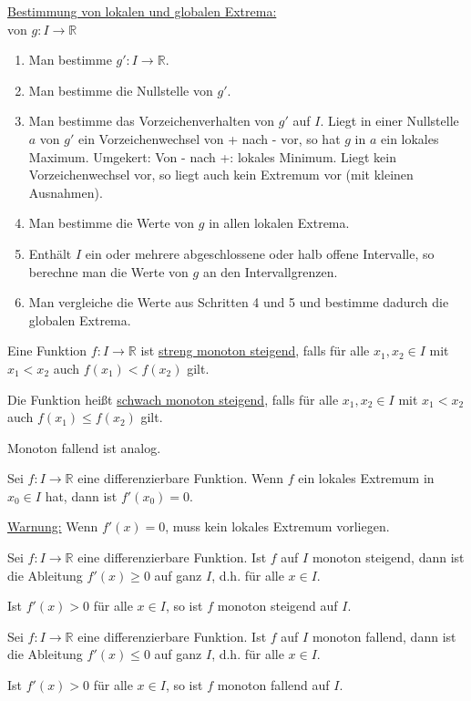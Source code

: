 \documentclass{mg2}
\begin{document}
\underline{Bestimmung von lokalen und globalen Extrema:}\\[1em]
von $g: I \to \mathbb{R}$

\begin{enumerate}
\item Man bestimme $g': I \to \mathbb{R}$.
\item Man bestimme die Nullstelle von $g'$.
\item Man bestimme das Vorzeichenverhalten von $g'$ auf $I$. Liegt in einer Nullstelle $a$ von $g'$ ein Vorzeichenwechsel von + nach - vor, so hat $g$ in $a$ ein lokales Maximum. Umgekert: Von - nach +: lokales Minimum. Liegt kein Vorzeichenwechsel vor, so liegt auch kein Extremum vor (mit kleinen Ausnahmen).
\item Man bestimme die Werte von $g$ in allen lokalen Extrema.
\item Enthält $I$ ein oder mehrere abgeschlossene oder halb offene Intervalle, so berechne man die Werte von $g$ an den Intervallgrenzen.
\item Man vergleiche die Werte aus Schritten 4 und 5 und bestimme dadurch die globalen Extrema.
\end{enumerate}

\begin{definition}[Monotonie]
Eine Funktion $f: I \to \mathbb{R}$ ist \underline{streng monoton steigend}, falls für alle $x_1,x_2 \in I$ mit $x_1 < x_2$ auch $f(x_1) < f(x_2)$ gilt.

Die Funktion heißt \underline{schwach monoton steigend}, falls für alle $x_1,x_2 \in I$ mit $x_1 < x_2$ auch $f(x_1) \leq f(x_2)$ gilt.

Monoton fallend ist analog.
\end{definition}

\begin{definition}
Sei $f: I \to \mathbb{R}$ eine differenzierbare Funktion. Wenn $f$ ein lokales Extremum in $x_0 \in I$ hat, dann ist $f'(x_0) = 0$.

\underline{Warnung:} Wenn $f'(x) = 0$, muss kein lokales Extremum vorliegen.
\end{definition}

\begin{definition}
Sei $f: I \to \mathbb{R}$ eine differenzierbare Funktion. Ist $f$ auf $I$ monoton steigend, dann ist die Ableitung $f'(x) \geq 0$ auf ganz $I$, d.h. für alle $x \in I$.

Ist $f'(x) > 0$ für alle $x \in I$, so ist $f$ monoton steigend auf $I$.

Sei $f: I \to \mathbb{R}$ eine differenzierbare Funktion. Ist $f$ auf $I$ monoton fallend, dann ist die Ableitung $f'(x) \leq 0$ auf ganz $I$, d.h. für alle $x \in I$.

Ist $f'(x) > 0$ für alle $x \in I$, so ist $f$ monoton fallend auf $I$.
\end{definition}
\end{document}
